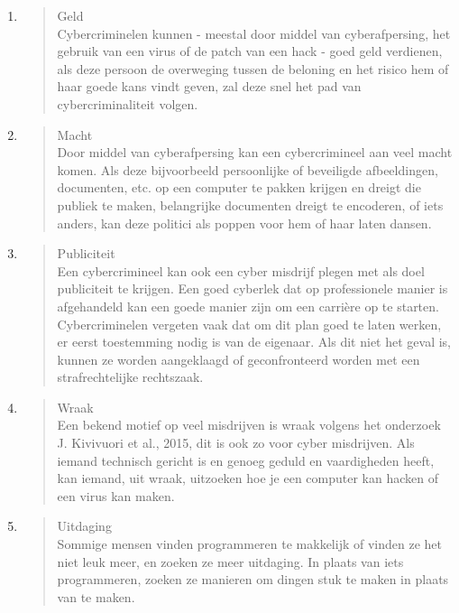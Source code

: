 \documentclass[
]{article}
\begin{document}
\begin{enumerate}
\def\labelenumi{\arabic{enumi}.}
\item
  \begin{quote}
  Geld\\
  Cybercriminelen kunnen - meestal door middel van cyberafpersing, het
  gebruik van een virus of de patch van een hack - goed geld verdienen,
  als deze persoon de overweging tussen de beloning en het risico hem of
  haar goede kans vindt geven, zal deze snel het pad van
  cybercriminaliteit volgen.
  \end{quote}
\item
  \begin{quote}
  Macht\\
  Door middel van cyberafpersing kan een cybercrimineel aan veel macht
  komen. Als deze bijvoorbeeld persoonlijke of beveiligde afbeeldingen,
  documenten, etc. op een computer te pakken krijgen en dreigt die
  publiek te maken, belangrijke documenten dreigt te encoderen, of iets
  anders, kan deze politici als poppen voor hem of haar laten dansen.
  \end{quote}
\item
  \begin{quote}
  Publiciteit\\
  Een cybercrimineel kan ook een cyber misdrijf plegen met als doel
  publiciteit te krijgen. Een goed cyberlek dat op professionele manier
  is afgehandeld kan een goede manier zijn om een carrière op te
  starten. Cybercriminelen vergeten vaak dat om dit plan goed te laten
  werken, er eerst toestemming nodig is van de eigenaar. Als dit niet
  het geval is, kunnen ze worden aangeklaagd of geconfronteerd worden
  met een strafrechtelijke rechtszaak.
  \end{quote}
\item
  \begin{quote}
  Wraak\\
  Een bekend motief op veel misdrijven is wraak volgens het onderzoek J.
  Kivivuori et al., 2015, dit is ook zo voor cyber misdrijven. Als
  iemand technisch gericht is en genoeg geduld en vaardigheden heeft,
  kan iemand, uit wraak, uitzoeken hoe je een computer kan hacken of een
  virus kan maken.
  \end{quote}
\item
  \begin{quote}
  Uitdaging\\
  Sommige mensen vinden programmeren te makkelijk of vinden ze het niet
  leuk meer, en zoeken ze meer uitdaging. In plaats van iets
  programmeren, zoeken ze manieren om dingen stuk te maken in plaats van
  te maken.
  \end{quote}
\end{enumerate}
\end{document}
